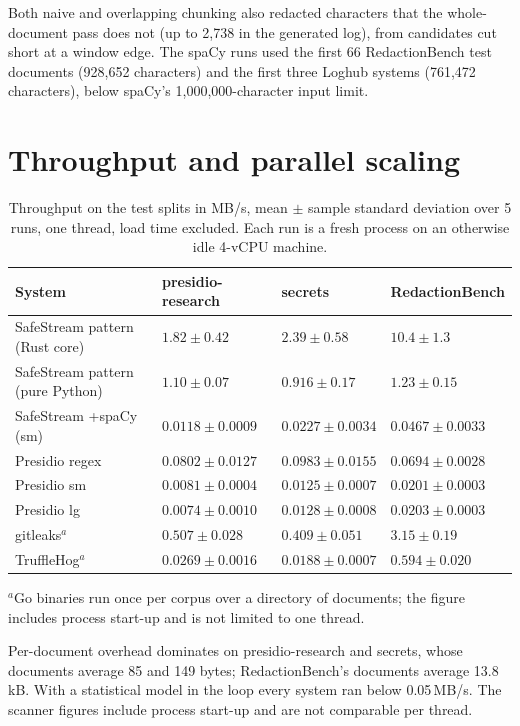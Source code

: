 \documentclass[11pt,a4paper]{article}
\begin{document}
Both naive and overlapping chunking also redacted characters that the whole-document pass does not (up to 2,738 in the generated log), from candidates cut short at a window edge. The spaCy runs used the first 66 RedactionBench test documents (928,652 characters) and the first three Loghub systems (761,472 characters), below spaCy's 1,000,000-character input limit.

\section{Throughput and parallel scaling}\label{s:throughput}

\begin{table}[ht]
\caption{Throughput on the test splits in MB/s, mean $\pm$ sample standard deviation over 5 runs, one thread, load time excluded. Each run is a fresh process on an otherwise idle 4-vCPU machine.}\label{t:throughput}
\small
\begin{tabular*}{\textwidth}{@{\extracolsep\fill}llll}
\toprule
System & presidio-research & secrets & RedactionBench \\
\midrule
SafeStream pattern (Rust core) & $1.82 \pm 0.42$ & $2.39 \pm 0.58$ & $10.4 \pm 1.3$ \\
SafeStream pattern (pure Python) & $1.10 \pm 0.07$ & $0.916 \pm 0.17$ & $1.23 \pm 0.15$ \\
SafeStream +spaCy (sm) & $0.0118 \pm 0.0009$ & $0.0227 \pm 0.0034$ & $0.0467 \pm 0.0033$ \\
Presidio regex & $0.0802 \pm 0.0127$ & $0.0983 \pm 0.0155$ & $0.0694 \pm 0.0028$ \\
Presidio sm & $0.0081 \pm 0.0004$ & $0.0125 \pm 0.0007$ & $0.0201 \pm 0.0003$ \\
Presidio lg & $0.0074 \pm 0.0010$ & $0.0128 \pm 0.0008$ & $0.0203 \pm 0.0003$ \\
gitleaks$^{a}$ & $0.507 \pm 0.028$ & $0.409 \pm 0.051$ & $3.15 \pm 0.19$ \\
TruffleHog$^{a}$ & $0.0269 \pm 0.0016$ & $0.0188 \pm 0.0007$ & $0.594 \pm 0.020$ \\
\bottomrule
\end{tabular*}

\smallskip
\footnotesize $^{a}$Go binaries run once per corpus over a directory of documents; the figure includes process start-up and is not limited to one thread.
\end{table}

Per-document overhead dominates on presidio-research and secrets, whose documents average 85 and 149 bytes; RedactionBench's documents average 13.8\,kB. With a statistical model in the loop every system ran below 0.05\,MB/s. The scanner figures include process start-up and are not comparable per thread.
\end{document}
